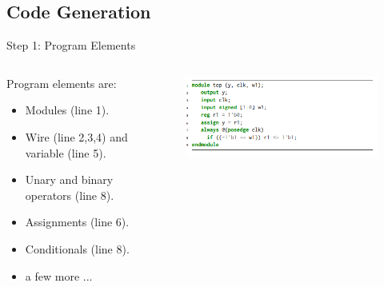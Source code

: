 \documentclass[notes, xcolor=dvipsnames]{beamer}
\begin{document}
    \subsection{Code Generation}
    \begin{frame}{Step 1: Program Elements}

        \begin{columns}
            
            \begin{column}[]{0.5\textwidth}
                
                Program elements are:
                \begin{itemize}  
                    \item Modules (line 1). 
                    \item Wire (line 2,3,4) and variable (line 5).
                    \item Unary and binary operators (line 8). 
                    \item Assignments (line 6).
                    \item Conditionals (line 8).
                    \item a few more ...     
                \end{itemize}
            \end{column}

            \begin{column}[]{0.5\textwidth}

                \begin{figure}
                    \includegraphics{Elements_Verilog_Deterministic.PNG}
                \end{figure}

            \end{column}

        \end{columns}

    \end{frame}
\end{document}
